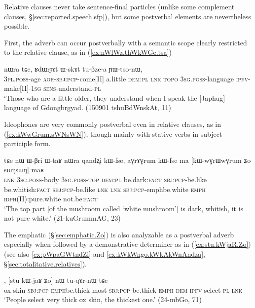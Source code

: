 Relative clauses never take sentence-final particles (unlike some complement clauses, §\ref{sec:reported.speech.sfp}), but some postverbal elements are nevertheless possible. 

First, the adverb  can occur postverbally with a semantic scope clearly restricted to the relative clause, as in (\ref{ex:nWlWz.thWkWGe.tsa}) 

\begin{exe}
\ex \label{ex:nWlWz.thWkWGe.tsa}
 nɯra tɕe, ʁdɯrɟɤt ɯ-skɤt tu-βze-a ɲɯ-tso-nɯ, \\
\textsc{3pl}.\textsc{poss}-age \textsc{aor}-\textsc{sbj}:\textsc{pcp}-come[II] a.little \textsc{dem}:\textsc{pl} \textsc{lnk}  \textsc{topo} \textsc{3sg}.\textsc{poss}-language \textsc{ipfv}-make[II]-\textsc{1sg} \textsc{sens}-understand-\textsc{pl} \\
\glt `Those who are a little older, they understand when I speak the [Japhug] language of Gdongbrgyad. (150901 tshuBdWnskAt, 11)
\end{exe} 

Ideophones are very commonly postverbal even in relative clauses, as in (\ref{ex:kWwGrum.sWNsWN}), though mainly with stative verbs in subject participle form.

\begin{exe}
\ex \label{ex:kWwGrum.sWNsWN}
\gll tɕe nɯ ɯ-βri ɯ-taʁ nɯra qandʐi kɯ-fse, aɣrɤɣrum kɯ-fse  ma [kɯ-wɣrɯ\redp{}wɣrum ʑo sɯŋsɯŋ] maʁ \\
\textsc{lnk} \textsc{3sg}.\textsc{poss}-body \textsc{3sg}.\textsc{poss}-\textsc{top} \textsc{dem}:\textsc{pl} be.dark:\textsc{fact} \textsc{sbj}:\textsc{pcp}-be.like be.whitish:\textsc{fact} \textsc{sbj}:\textsc{pcp}-be.like \textsc{lnk} \textsc{lnk} \textsc{sbj}:\textsc{pcp}-emph\redp{}be.white \textsc{emph} \textsc{idph}(II):pure.white not.be:\textsc{fact} \\
\glt `The top part [of the mushroom called  `white mushroom'] is dark, whitish, it is not pure white.' (21-kuGrummAG, 23)
\end{exe} 

The emphatic  (§\ref{sec:emphatic.Zo}) is also analyzable as a postverbal adverb especially when followed by a demonstrative determiner as in (\ref{ex:stu.kWjaR.Zo}) (see also \ref{ex:pWpaGWtndZi} and \ref{ex:kWkWngo.kWkAkWnAndza}, §\ref{sec:totalitative.relatives}).

\begin{exe}
\ex \label{ex:stu.kWjaR.Zo}
, [stu kɯ-jaʁ ʑo] nɯ tu-qɤr-nɯ tɕe \\
ox-skin \textsc{sbj}:\textsc{pcp}-\textsc{emph}\redp{}be.thick most \textsc{sbj}:\textsc{pcp}-be.thick \textsc{emph} \textsc{dem} \textsc{ipfv}-select-\textsc{pl} \textsc{lnk} \\
\glt `People select very thick ox skin, the thickest one.' (24-mbGo, 71)
\end{exe} 


